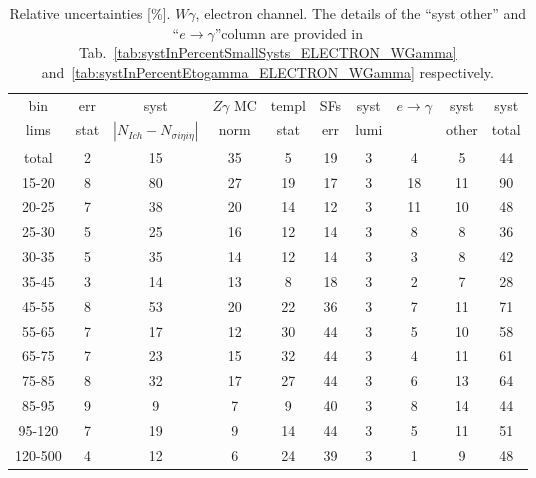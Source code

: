 \begin{table}[h]
  \scriptsize
  \begin{center}
  \caption{Relative uncertainties [\%]. $W\gamma$, electron channel. The details of the ``syst other'' and ``$e\rightarrow\gamma$''column are provided in Tab.~\ref{tab:systInPercentSmallSysts_ELECTRON_WGamma} and~\ref{tab:systInPercentEtogamma_ELECTRON_WGamma} respectively. }
   \begin{tabular}{|c|c|c|c|c|c|c|c|c|c|}
    bin  & err & syst & $Z\gamma$ MC & templ & SFs & syst & $e\rightarrow\gamma$ & syst & syst\\
    lims  & stat & $|N_{Ich}-N_{\sigma{i\eta i\eta}}|$ & norm & stat & err & lumi &  & other & total\\ \hline
    total  & 2 & 15 & 35 & 5 & 19 & 3 & 4 & 5 & 44 \\ \hline
    15-20 & 8 & 80 & 27 & 19 & 17 & 3 & 18 & 11 & 90 \\ \hline
    20-25 & 7 & 38 & 20 & 14 & 12 & 3 & 11 & 10 & 48 \\ \hline
    25-30 & 5 & 25 & 16 & 12 & 14 & 3 & 8 & 8 & 36 \\ \hline
    30-35 & 5 & 35 & 14 & 12 & 14 & 3 & 3 & 8 & 42 \\ \hline
    35-45 & 3 & 14 & 13 & 8 & 18 & 3 & 2 & 7 & 28 \\ \hline
    45-55 & 8 & 53 & 20 & 22 & 36 & 3 & 7 & 11 & 71 \\ \hline
    55-65 & 7 & 17 & 12 & 30 & 44 & 3 & 5 & 10 & 58 \\ \hline
    65-75 & 7 & 23 & 15 & 32 & 44 & 3 & 4 & 11 & 61 \\ \hline
    75-85 & 8 & 32 & 17 & 27 & 44 & 3 & 6 & 13 & 64 \\ \hline
    85-95 & 9 & 9 & 7 & 9 & 40 & 3 & 8 & 14 & 44 \\ \hline
    95-120 & 7 & 19 & 9 & 14 & 44 & 3 & 5 & 11 & 51 \\ \hline
    120-500 & 4 & 12 & 6 & 24 & 39 & 3 & 1 & 9 & 48 \\ \hline
  \end{tabular}
  \label{tab:systInPercent_ELECTRON_WGamma}
  \end{center}
\end{table}


